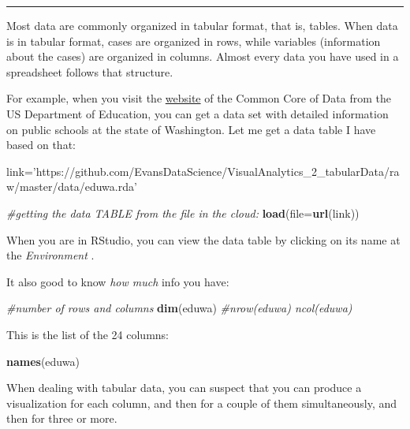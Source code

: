 \documentclass[]{article}
\newenvironment{Shaded}{\begin{snugshade}}{\end{snugshade}}
\newcommand{\KeywordTok}[1]{\textcolor[rgb]{0.13,0.29,0.53}{\textbf{#1}}}
\newcommand{\DataTypeTok}[1]{\textcolor[rgb]{0.13,0.29,0.53}{#1}}
\newcommand{\StringTok}[1]{\textcolor[rgb]{0.31,0.60,0.02}{#1}}
\newcommand{\CommentTok}[1]{\textcolor[rgb]{0.56,0.35,0.01}{\textit{#1}}}
\newcommand{\NormalTok}[1]{#1}
\begin{document}
\begin{center}\rule{0.5\linewidth}{\linethickness}\end{center}

Most data are commonly organized in tabular format, that is, tables.
When data is in tabular format, cases are organized in rows, while
variables (information about the cases) are organized in columns. Almost
every data you have used in a spreadsheet follows that structure.

For example, when you visit the \href{https://nces.ed.gov/ccd/}{website}
of the Common Core of Data from the US Department of Education, you can
get a data set with detailed information on public schools at the state
of Washington. Let me get a data table I have based on that:

\begin{Shaded}
\begin{Highlighting}[]
\NormalTok{link=}\StringTok{'https://github.com/EvansDataScience/VisualAnalytics_2_tabularData/raw/master/data/eduwa.rda'}

\CommentTok{#getting the data TABLE from the file in the cloud:}
\KeywordTok{load}\NormalTok{(}\DataTypeTok{file=}\KeywordTok{url}\NormalTok{(link))}
\end{Highlighting}
\end{Shaded}

When you are in RStudio, you can view the data table by clicking on its
name at the \emph{Environment} .

It also good to know \emph{how much} info you have:

\begin{Shaded}
\begin{Highlighting}[]
\CommentTok{#number of rows and columns}
\KeywordTok{dim}\NormalTok{(eduwa) }\CommentTok{#nrow(eduwa) ncol(eduwa)}
\end{Highlighting}
\end{Shaded}

This is the list of the 24 columns:

\begin{Shaded}
\begin{Highlighting}[]
\KeywordTok{names}\NormalTok{(eduwa)}
\end{Highlighting}
\end{Shaded}

When dealing with tabular data, you can suspect that you can produce a
visualization for each column, and then for a couple of them
simultaneously, and then for three or more.
\end{document}
